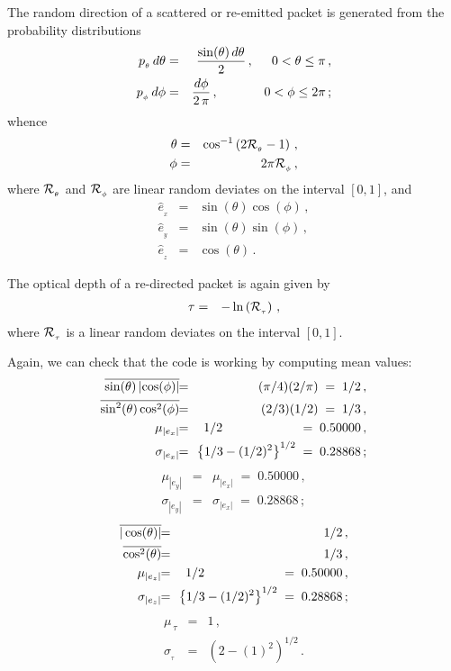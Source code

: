 \documentclass[usenatbib]{mn2e}
\numberwithin{equation}{section}
\begin{document}
The random direction of a scattered or re-emitted packet is generated from the probability distributions 
\begin{eqnarray}
p_{_\theta}\,d\theta&=&\frac{\sin(\theta)\,d\theta}{2}\,,\hspace{0.5cm}0<\theta\leq\pi\,,\\
p_{_\phi}\,d\phi&=&\frac{d\phi}{2\,\pi}\,,\hspace{1.27cm}0<\phi\leq 2\pi\,;
\end{eqnarray}
whence 
\begin{eqnarray}
\theta&=&\cos^{-1}\left(2{\cal R}_{_\theta}-1\right)\,,\\
\phi&=&2\pi {\cal R}_{_\phi}\,,
\end{eqnarray}
where ${\cal R}_{_\theta}$ and ${\cal R}_{_\phi}$ are linear random deviates on the interval $[0,1]$, and
\begin{eqnarray}
{\hat e}_{_x}&=&\sin(\theta)\cos(\phi)\,,\\
{\hat e}_{_y}&=&\sin(\theta)\sin(\phi)\,,\\
{\hat e}_{_z}&=&\cos(\theta)\,.
\end{eqnarray}

The optical depth of a re-directed packet is again given by 
\begin{eqnarray}
\tau&=&-\ln\left({\cal R}_{_\tau}\right)\,,
\end{eqnarray}
where ${\cal R}_{_\tau}$ is a linear random deviates on the interval $[0,1]$.

Again, we can check that the code is working by computing mean values:
\begin{eqnarray}\nonumber
\overline{\sin(\theta)\,|\!\cos(\phi)|}\!&\!=\!&\!(\pi/4)(2/\pi)\;=\;1/2\,,\\\nonumber
\overline{\sin^2(\theta)\cos^2(\phi)}\!&\!=\!&\!(2/3)(1/2)\;=\;1/3\,,\\
\mu_{|e_x|}\!&\!=\!&\!1/2\hspace{2.15cm}=\;0.50000\,,\\
\sigma_{|e_x|}\!&\!=\!&\!\left\{1/3-(1/2)^2\right\}^{1/2}\;=\;0.28868\,;
\end{eqnarray}
\begin{eqnarray}
\mu_{|e_y|}\!&\!=\!&\!\mu_{|e_x|}\;=\;0.50000\,,\\
\sigma_{|e_y|}\!&\!=\!&\!\sigma_{|e_x|}\;=\;0.28868\,;
\end{eqnarray}
\begin{eqnarray}\nonumber
\overline{|\cos(\theta)|}\!&\!=\!&\!1/2\,,\\\nonumber
\overline{\cos^2(\theta)}\!&\!=\!&\!1/3\,,\\
\mu_{|e_z|}\!&\!=\!&\!1/2\hspace{2.15cm}=\;0.50000\,,\\
\sigma_{|e_z|}\!&\!=\!&\!\left\{1/3-(1/2)^2\right\}^{1/2}\;=\;0.28868\,;
\end{eqnarray}
\begin{eqnarray}
\mu_{\,\tau}&=&1\,,\\
\sigma_{_\tau}&=&\left(2-(1)^2\right)^{1/2}\,.
\end{eqnarray}
\end{document}
